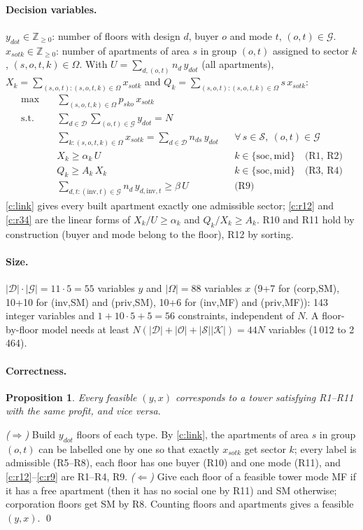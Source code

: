 \documentclass[11pt,a4paper]{article}
\newtheorem{proposition}{Proposition}
\newcommand{\Dset}{\mathcal{D}}
\newcommand{\Sset}{\mathcal{S}}
\newcommand{\Oset}{\mathcal{O}}
\newcommand{\Kset}{\mathcal{K}}
\newcommand{\Gset}{\mathcal{G}}
\newcommand{\soc}{\text{soc}}
\newcommand{\midd}{\text{mid}}
\newcommand{\inv}{\text{inv}}
\begin{document}
\paragraph{Decision variables.}
$y_{dot}\in\mathbb{Z}_{\ge0}$: number of floors with design $d$, buyer $o$ and mode
$t$, $(o,t)\in\Gset$. \quad
$x_{sotk}\in\mathbb{Z}_{\ge0}$: number of apartments of area $s$ in group
$(o,t)$ assigned to sector $k$, $(s,o,t,k)\in\Omega$.
With $U=\sum_{d,(o,t)} n_d\,y_{dot}$ (all apartments),
$X_k=\sum_{(s,o,t):(s,o,t,k)\in\Omega} x_{sotk}$ and
$Q_k=\sum_{(s,o,t):(s,o,t,k)\in\Omega} s\,x_{sotk}$:
\begin{align}
\max\quad & \textstyle\sum_{(s,o,t,k)\in\Omega} p_{sko}\,x_{sotk} \label{obj}\\
\text{s.t.}\quad
& \textstyle\sum_{d\in\Dset}\sum_{(o,t)\in\Gset} y_{dot} = N \label{c:floors}\\
& \textstyle\sum_{k:(s,o,t,k)\in\Omega} x_{sotk} = \sum_{d\in\Dset} n_{ds}\,y_{dot}
   && \forall\, s\in\Sset,\ (o,t)\in\Gset \label{c:link}\\
& X_k \ge \alpha_k\, U && k\in\{\soc,\midd\} \quad \text{(R1, R2)} \label{c:r12}\\
& Q_k \ge A_k\, X_k && k\in\{\soc,\midd\} \quad \text{(R3, R4)} \label{c:r34}\\
& \textstyle\sum_{d,t:(\inv,t)\in\Gset} n_d\,y_{d,\inv,t} \ge \beta\, U && \text{(R9)} \label{c:r9}
\end{align}
\eqref{c:link} gives every built apartment exactly one admissible sector;
\eqref{c:r12} and \eqref{c:r34} are the linear forms of $X_k/U\ge\alpha_k$ and
$Q_k/X_k\ge A_k$. R10 and R11 hold by construction (buyer and mode belong to
the floor), R12 by sorting.

\paragraph{Size.} $|\Dset|\cdot|\Gset|=11\cdot5=55$ variables $y$ and $|\Omega|=88$
variables $x$ (9+7 for (corp,SM), 10+10 for (inv,SM) and (priv,SM), 10+6 for (inv,MF)
and (priv,MF)): 143 integer variables and $1+10\cdot5+5=56$ constraints, independent of $N$.
A floor-by-floor model needs at least $N(|\Dset|+|\Oset|+|\Sset||\Kset|)=44N$ variables
(1\,012 to 2\,464).

\paragraph{Correctness.}
\begin{proposition}\label{prop:agg}
Every feasible $(y,x)$ corresponds to a tower satisfying R1--R11 with the same
profit, and vice versa.
\end{proposition}
\emph{($\Rightarrow$)} Build $y_{dot}$ floors of each type. By \eqref{c:link}, the
apartments of area $s$ in group $(o,t)$ can be labelled one by one so that
exactly $x_{sotk}$ get sector $k$; every label is admissible (R5--R8), each floor
has one buyer (R10) and one mode (R11), and \eqref{c:r12}--\eqref{c:r9} are R1--R4, R9.
\emph{($\Leftarrow$)} Give each floor of a feasible tower mode MF if it has a free
apartment (then it has no social one by R11) and SM otherwise; corporation floors
get SM by R8. Counting floors and apartments gives a feasible $(y,x)$. \qed
\end{document}
